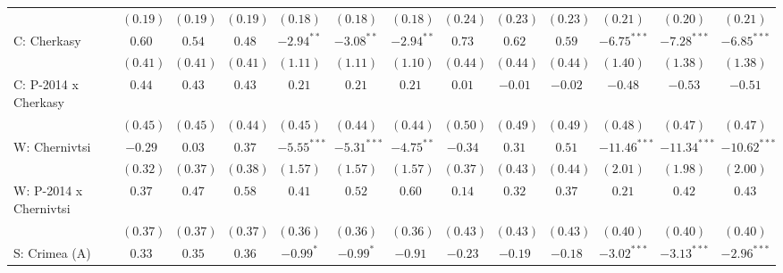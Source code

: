 \begin{table}
\begin{center}
\begin{tiny}
\begin{tabular}{l c c c c c c c c c c c c}
                            & $(0.19)$      & $(0.19)$      & $(0.19)$       & $(0.18)$      & $(0.18)$      & $(0.18)$      & $(0.24)$      & $(0.23)$       & $(0.23)$       & $(0.21)$       & $(0.20)$       & $(0.21)$       \\
C: Cherkasy                 & $0.60$        & $0.54$        & $0.48$         & $-2.94^{**}$  & $-3.08^{**}$  & $-2.94^{**}$  & $0.73$        & $0.62$         & $0.59$         & $-6.75^{***}$  & $-7.28^{***}$  & $-6.85^{***}$  \\
                            & $(0.41)$      & $(0.41)$      & $(0.41)$       & $(1.11)$      & $(1.11)$      & $(1.10)$      & $(0.44)$      & $(0.44)$       & $(0.44)$       & $(1.40)$       & $(1.38)$       & $(1.38)$       \\
C: P-2014 x Cherkasy        & $0.44$        & $0.43$        & $0.43$         & $0.21$        & $0.21$        & $0.21$        & $0.01$        & $-0.01$        & $-0.02$        & $-0.48$        & $-0.53$        & $-0.51$        \\
                            & $(0.45)$      & $(0.45)$      & $(0.44)$       & $(0.45)$      & $(0.44)$      & $(0.44)$      & $(0.50)$      & $(0.49)$       & $(0.49)$       & $(0.48)$       & $(0.47)$       & $(0.47)$       \\
W: Chernivtsi               & $-0.29$       & $0.03$        & $0.37$         & $-5.55^{***}$ & $-5.31^{***}$ & $-4.75^{**}$  & $-0.34$       & $0.31$         & $0.51$         & $-11.46^{***}$ & $-11.34^{***}$ & $-10.62^{***}$ \\
                            & $(0.32)$      & $(0.37)$      & $(0.38)$       & $(1.57)$      & $(1.57)$      & $(1.57)$      & $(0.37)$      & $(0.43)$       & $(0.44)$       & $(2.01)$       & $(1.98)$       & $(2.00)$       \\
W: P-2014 x Chernivtsi      & $0.37$        & $0.47$        & $0.58$         & $0.41$        & $0.52$        & $0.60$        & $0.14$        & $0.32$         & $0.37$         & $0.21$         & $0.42$         & $0.43$         \\
                            & $(0.37)$      & $(0.37)$      & $(0.37)$       & $(0.36)$      & $(0.36)$      & $(0.36)$      & $(0.43)$      & $(0.43)$       & $(0.43)$       & $(0.40)$       & $(0.40)$       & $(0.40)$       \\
S: Crimea (A)               & $0.33$        & $0.35$        & $0.36$         & $-0.99^{*}$   & $-0.99^{*}$   & $-0.91$       & $-0.23$       & $-0.19$        & $-0.18$        & $-3.02^{***}$  & $-3.13^{***}$  & $-2.96^{***}$  \\

\end{tabular}
\end{tiny}
\end{center}
\end{table}
